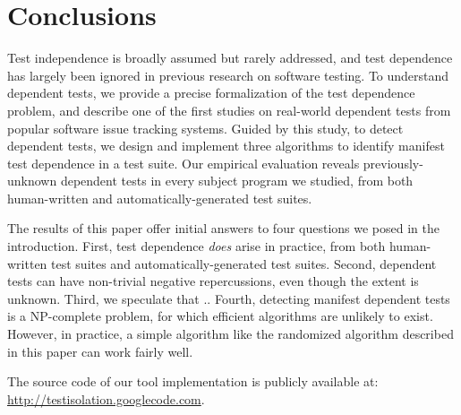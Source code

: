 \section{Conclusions}
\label{sec:questions}

Test independence is broadly assumed but rarely addressed, and
test dependence has largely been ignored in previous
research on software testing. To understand
dependent tests, we provide a precise formalization of the test dependence problem,
and describe one of the first studies on real-world dependent
tests from popular software issue tracking systems. Guided by
this study, to detect dependent tests, we design
and implement three algorithms to identify manifest test dependence
in a test suite. Our empirical evaluation reveals
previously-unknown dependent tests in every subject program
we studied, from both human-written and automatically-generated test
suites.

The results of this paper offer initial answers to four questions we posed
in the introduction. First, test dependence \textit{does}
arise in practice, from both human-written test suites and automatically-generated
test suites. Second, dependent tests can have
non-trivial negative repercussions, even though the
extent is unknown. Third, we speculate
 that .. Fourth,
detecting manifest dependent tests is a NP-complete problem,
for which efficient algorithms are unlikely to exist. However,
in practice, a simple algorithm like the randomized algorithm
described in this paper can work fairly well.

The source code of our tool implementation is publicly
available at: \url{http://testisolation.googlecode.com}.
